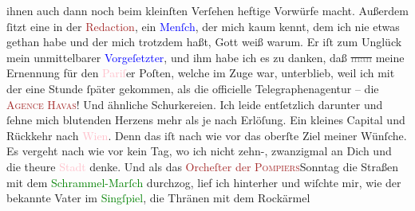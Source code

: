 \documentclass[twoside=false,titlepage=false,open=any, parskip=never, fontsize=12pt, headings=small, chapterprefix=false, appendixprefix=false]{scrbook}
\newcommand{\strikeout}[1]{\sout{#1}}
\newcommand{\pbposition}{\depth}
\newcommand{\pb}{\nobreak\hspace{0pt}\raisebox{-0.1em}{\raisebox{\pbposition}{\textnormal{|}}}\nobreak\hspace{0pt}}
\begin{document}
               ihnen auch {\pb}dann noch beim kleinſten Verſehen
               heftige Vorwürfe macht. Außerdem ſitzt eine \label{K_L02669-10v}\label{K_L02669-10h} in der \textcolor{brown}{Redaction}{}, ein \textcolor{blue}{Menſch}{}, der mich kaum kennt, dem ich nie
               etwas gethan habe und der mich trotzdem haßt, Gott weiß warum. Er iſt zum Unglück
               mein unmittelbarer \textcolor{blue}{Vorgeſetzter}{}, und ihm habe ich es zu danken, daß \strikeout{\textcolor{gray}{man}} meine Ernennung für den \textcolor{pink}{Pariſ}{}\ledrightnote{\textcolor{pink}{Paris}}er Poſten,
               welche im Zuge war, unterblieb, weil ich mit der \label{K_L02669-777v}\label{K_L02669-777h} eine Stunde ſpäter gekommen, als die officielle
               Telegraphenagentur – die \textsc{\textcolor{brown}{Agence Havas}{}\ledrightnote{\textcolor{brown}{Agence Havas}}}! Und ähnliche Schurkereien. Ich leide entſetzlich darunter und ſehne mich
               blutenden Herzens mehr als je nach Erlöſung. Ein kleines Capital und Rückkehr nach
                  \textcolor{pink}{Wien}{}\ledrightnote{\textcolor{pink}{Wien}}. Denn das iſt nach wie vor das oberſte
               Ziel meiner Wünſche. Es vergeht nach wie vor kein Tag, {\pb}wo ich nicht zehn-, zwanzigmal an Dich und die
               theure \textcolor{pink}{Stadt}{} denke. Und als das
                  \textcolor{brown}{Orcheſter der \textsc{Pompiers}}{}\ledrightnote{\textcolor{brown}{Orchestre municipal des pompiers de Bruxelles}}{ }Sonntag die Straßen mit dem \textcolor{green}{Schrammel-Marſch}{} durchzog, lief ich
               hinterher und wiſchte mir, wie der bekannte Vater im \textcolor{green}{Singſpiel}{}, die Thränen mit dem Rockärmel
\end{document}
